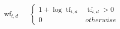 \documentclass[convert={density=150}]{standalone}
\begin{document}
	$\operatorname{wf}_{t,d} = \begin{cases}
		1 + \log \operatorname{tf}_{t,d} & \operatorname{tf}_{t,d} > 0 \\
		0	& otherwise
		\end{cases}
		$
\end{document}
